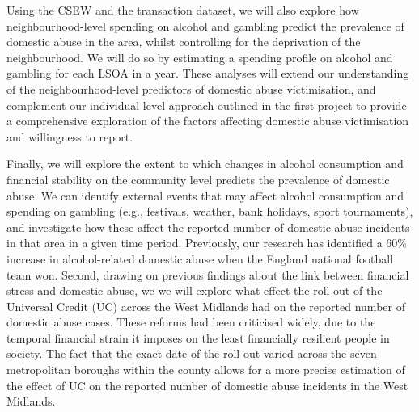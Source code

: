 \documentclass[11pt, a4paper]{article}
\begin{document}
Using the CSEW and the transaction dataset, we will also explore how neighbourhood-level spending on alcohol and gambling predict the prevalence of domestic abuse in the area, whilst controlling for the deprivation of the neighbourhood. We will do so by estimating a spending profile on alcohol and gambling for each LSOA in a year. These analyses will extend our understanding of the neighbourhood-level predictors of domestic abuse victimisation, and complement our individual-level approach outlined in the first project to provide a comprehensive exploration of the factors affecting domestic abuse victimisation and willingness to report.


Finally, we will explore the extent to which changes in alcohol consumption and financial stability on the community level predicts the prevalence of domestic abuse. We can identify external events that may affect alcohol consumption  and spending on gambling (e.g., festivals, weather, bank holidays, sport tournaments), and investigate how these affect the reported number of domestic abuse incidents in that area in a given time period. Previously, our research has identified a 60\% increase in alcohol-related domestic abuse when the England national football team won. Second, drawing on previous findings about the link between financial stress and domestic abuse, we we will explore what effect the roll-out of the Universal Credit (UC) across the West Midlands had on the reported number of domestic abuse cases. These reforms had been criticised widely, due to the temporal financial strain it imposes on the least financially resilient people in society. The fact that the exact date of the roll-out varied across the seven metropolitan boroughs within the county allows for a more precise estimation of the effect of UC on the reported number of domestic abuse incidents in the West Midlands.
\end{document}

